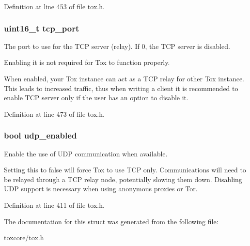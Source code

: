 Definition at line 453 of file tox.\+h.

\hypertarget{struct_tox___options_a7c66715252e093e0b8b751a0c888623e}{
\subsubsection[{tcp\+\_\+port}]{\setlength{\rightskip}{0pt plus 5cm}uint16\+\_\+t tcp\+\_\+port}}\label{struct_tox___options_a7c66715252e093e0b8b751a0c888623e}
The port to use for the T\+C\+P server (relay). If 0, the T\+C\+P server is disabled.

Enabling it is not required for Tox to function properly.

When enabled, your Tox instance can act as a T\+C\+P relay for other Tox instance. This leads to increased traffic, thus when writing a client it is recommended to enable T\+C\+P server only if the user has an option to disable it. 

Definition at line 473 of file tox.\+h.

\hypertarget{struct_tox___options_a35c23f2b9cd2468e2a256ca93a21d5d5}{
\subsubsection[{udp\+\_\+enabled}]{\setlength{\rightskip}{0pt plus 5cm}bool udp\+\_\+enabled}}\label{struct_tox___options_a35c23f2b9cd2468e2a256ca93a21d5d5}
Enable the use of U\+D\+P communication when available.

Setting this to false will force Tox to use T\+C\+P only. Communications will need to be relayed through a T\+C\+P relay node, potentially slowing them down. Disabling U\+D\+P support is necessary when using anonymous proxies or Tor. 

Definition at line 411 of file tox.\+h.



The documentation for this struct was generated from the following file\+:\begin{DoxyCompactItemize}
\item 
toxcore/tox.\+h\end{DoxyCompactItemize}
